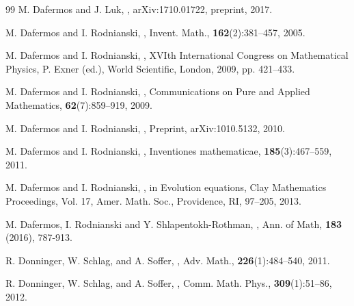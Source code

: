 \documentclass[10pt,a4paper,reqno]{amsart}
\theoremstyle{definition}
\theoremstyle{remark}
\numberwithin{equation}{section}
\begin{document}
\begin{thebibliography}{99}
 M. Dafermos and J. Luk, 
,
\newblock arXiv:1710.01722, preprint, 2017. %

 M. Dafermos and I. Rodnianski, 
,
\newblock Invent. Math., \textbf{162}(2):381--457, 2005.

 M. Dafermos and I. Rodnianski,
,
\newblock XVIth International Congress on Mathematical Physics, P. Exner (ed.), World Scientific, London, 2009, pp. 421--433.

 M. Dafermos and I. Rodnianski,
,
\newblock Communications on Pure and Applied Mathematics, \textbf{62}(7):859--919, 2009.

 M. Dafermos and I. Rodnianski,
,
\newblock Preprint, arXiv:1010.5132, 2010.

 M. Dafermos and I. Rodnianski,
,
\newblock Inventiones mathematicae, \textbf{185}(3):467--559, 2011.

 M. Dafermos and I. Rodnianski,
,
\newblock in Evolution equations, Clay Mathematics Proceedings, Vol. 17, Amer. Math. Soc., Providence, RI, 97--205, 2013.

 M. Dafermos, I. Rodnianski and Y. Shlapentokh-Rothman,
,
\newblock Ann. of Math, \textbf{183} (2016), 787-913.

 R. Donninger, W. Schlag, and A. Soffer, 
,
\newblock Adv. Math., \textbf{226}(1):484--540, 2011.

 R. Donninger, W. Schlag, and A. Soffer, 
,
\newblock Comm. Math. Phys., \textbf{309}(1):51--86, 2012.


\end{thebibliography}
\end{document}
